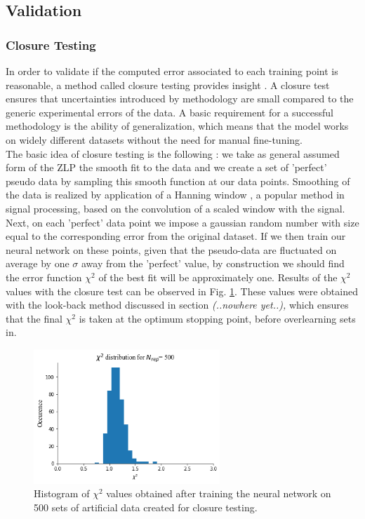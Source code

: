 \documentclass[11pt,a4paper]{article}
\numberwithin{equation}{section}
\numberwithin{figure}{section}
\numberwithin{table}{section}
\begin{document}
\subsection{Validation}

\subsubsection*{Closure Testing}
In order to validate if the computed error associated to each training point is reasonable, a method called closure testing provides insight \cite{closure}. A closure test ensures that uncertainties introduced by methodology are small compared to the generic experimental errors of the data. A basic requirement for a successful methodology is the ability of generalization, which means that the model works on widely different datasets without the need for manual fine-tuning.\\
The basic idea of closure testing is the following \cite{closure}: we take as general assumed form of the ZLP the smooth fit to the data and we create a set of 'perfect' pseudo data by sampling this smooth function at our data points. Smoothing of the data is realized by application of a Hanning window \cite{hann}, a popular method in signal processing, based on the convolution of a scaled window with the signal. \\
Next, on each 'perfect' data point we impose a gaussian random number with size equal to the corresponding error from the original dataset. If we then train our neural network on these points, given that the pseudo-data are fluctuated on average by one $\sigma$ away from the 'perfect' value, by construction we should find the error function $\chi^2$ of the best fit will be approximately one. Results of the $\chi^2$ values with the closure test can be observed in Fig. \ref{closure1}. These values were obtained with the look-back method discussed in section \textit{ (..nowhere yet..),} which ensures that the final $\chi^2$ is taken at the optimum stopping point, before overlearning sets in.

\begin{figure}[H]
    \centering
    \includegraphics[width=70mm]{plots/chi2.png}
    \caption{Histogram of $\chi^2$ values obtained after training the neural network on 500 sets of artificial data created for closure testing.}
    \label{closure1}
\end{figure}
\end{document}
